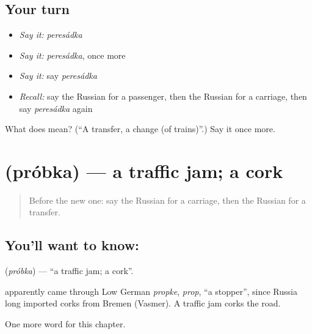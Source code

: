 \subsection*{Your turn}
\begin{itemize}
\raggedright
  \item \emph{Say it:} \emph{peresádka}
  \item \emph{Say it:} \emph{peresádka}, once more
  \item \emph{Say it:} say \emph{peresádka}
  \item \emph{Recall:} say the Russian for a passenger, then the Russian for a carriage, then say \emph{peresádka} again
\end{itemize}

\begin{tcolorbox}[breakable,colback=teal!4,colframe=teal!35!black,title={Before you move on}]
What does  mean? (\textquotedblleft{}A transfer, a change (of trains)\textquotedblright{}.) Say it once more.
\end{tcolorbox}
\section[\texorpdfstring{\ru{пробка} (próbka)}{пробка (próbka)}]{ (próbka) — a traffic jam; a cork}

\label{lesson:RU-C198-probka}



\begin{quote}
Before the new one: say the Russian for a carriage, then the Russian for a transfer.
\end{quote}

\subsection*{You'll want to know: }
\textbf{} (\emph{próbka}) — \textquotedblleft{}a traffic jam; a cork\textquotedblright{}.

\begin{cousinweb}
\textbf{} apparently came through Low German \emph{propke}, \emph{prop}, \textquotedblleft{}a stopper\textquotedblright{}, since Russia long imported corks from Bremen (Vasmer). A traffic jam corks the road.
\end{cousinweb}

\begin{grammarlens}[title={What you've built}]
One more word for this chapter.
\end{grammarlens}

